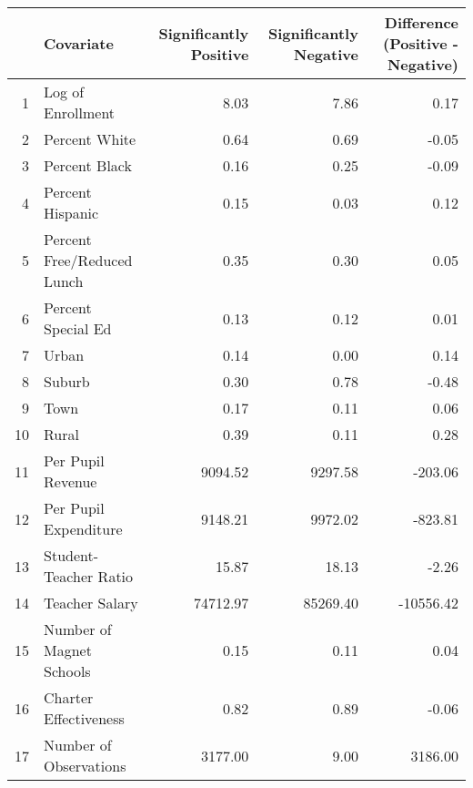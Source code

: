 \begin{tabular}{rlrrr}
  \hline
 & Covariate & Significantly Positive & Significantly Negative & Difference (Positive - Negative) \\ 
  \hline
1 & Log of Enrollment & 8.03 & 7.86 & 0.17 \\ 
  2 & Percent White & 0.64 & 0.69 & -0.05 \\ 
  3 & Percent Black & 0.16 & 0.25 & -0.09 \\ 
  4 & Percent Hispanic & 0.15 & 0.03 & 0.12 \\ 
  5 & Percent Free/Reduced Lunch & 0.35 & 0.30 & 0.05 \\ 
  6 & Percent Special Ed & 0.13 & 0.12 & 0.01 \\ 
  7 & Urban & 0.14 & 0.00 & 0.14 \\ 
  8 & Suburb & 0.30 & 0.78 & -0.48 \\ 
  9 & Town & 0.17 & 0.11 & 0.06 \\ 
  10 & Rural & 0.39 & 0.11 & 0.28 \\ 
  11 & Per Pupil Revenue & 9094.52 & 9297.58 & -203.06 \\ 
  12 & Per Pupil Expenditure & 9148.21 & 9972.02 & -823.81 \\ 
  13 & Student-Teacher Ratio & 15.87 & 18.13 & -2.26 \\ 
  14 & Teacher Salary & 74712.97 & 85269.40 & -10556.42 \\ 
  15 & Number of Magnet Schools & 0.15 & 0.11 & 0.04 \\ 
  16 & Charter Effectiveness & 0.82 & 0.89 & -0.06 \\ 
  17 & Number of Observations & 3177.00 & 9.00 & 3186.00 \\ 
   \hline
\end{tabular}
